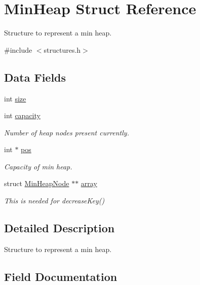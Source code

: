 \hypertarget{struct_min_heap}{}\section{Min\+Heap Struct Reference}
\label{struct_min_heap}


Structure to represent a min heap.  




{\ttfamily \#include $<$structures.\+h$>$}

\subsection*{Data Fields}
\begin{DoxyCompactItemize}
\item 
int \mbox{\hyperlink{struct_min_heap_a439227feff9d7f55384e8780cfc2eb82}{size}}
\item 
int \mbox{\hyperlink{struct_min_heap_adbe66a087ac3fd4a5b0566f64ca2d12b}{capacity}}
\begin{DoxyCompactList}\small\item\em Number of heap nodes present currently. \end{DoxyCompactList}\item 
int $\ast$ \mbox{\hyperlink{struct_min_heap_a04b54efc5a27053402ab5c4642c50200}{pos}}
\begin{DoxyCompactList}\small\item\em Capacity of min heap. \end{DoxyCompactList}\item 
struct \mbox{\hyperlink{struct_min_heap_node}{Min\+Heap\+Node}} $\ast$$\ast$ \mbox{\hyperlink{struct_min_heap_ae9b46f143cf5f5e962d8985b888e86a1}{array}}
\begin{DoxyCompactList}\small\item\em This is needed for decrease\+Key() \end{DoxyCompactList}\end{DoxyCompactItemize}


\subsection{Detailed Description}
Structure to represent a min heap. 

\subsection{Field Documentation}
\mbox{\label{struct_min_heap_ae9b46f143cf5f5e962d8985b888e86a1}} 

